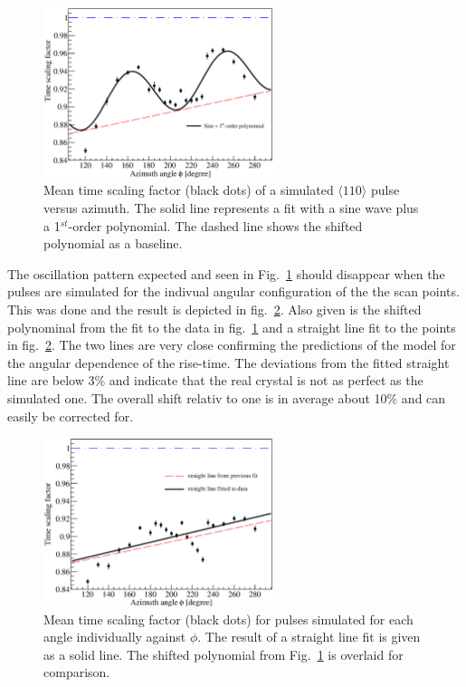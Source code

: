 \begin{figure}[htbp]
\centering
\includegraphics[width=0.6\textwidth]{tsc}
\caption{Mean time scaling factor (black dots) of a simulated $\langle 110 \rangle$ pulse versus azimuth. The solid line represents a fit with a sine wave plus a 1$^{st}$-order polynomial. The dashed line shows the shifted polynomial as a baseline.}
\label{fig:psa:tsc}
\end{figure}

The oscillation pattern expected and seen in Fig.~\ref{fig:psa:tsc} should disappear when the pulses are simulated for the indivual angular configuration of the the scan points. This was done and the result is depicted in fig.~\ref{fig:psa:tsl}. Also given is the shifted polynominal from the fit to the data in 
fig.~\ref{fig:psa:tsc} and a straight line fit to the points in fig.~\ref{fig:psa:tsl}. The two lines are very close confirming the predictions of the model for the angular dependence of the rise-time. The deviations from the fitted straight line are below 3\% and indicate that the real crystal is not as perfect as the simulated one. The overall shift relativ to one is in average about 10\% and can easily be corrected for. 

\begin{figure}[htbp]
\centering
\includegraphics[width=0.6\textwidth]{tsline}
\caption{Mean time scaling factor (black dots) for pulses simulated for each angle individually against $\phi$. 
The result of a straight line fit is given as a solid line.
The shifted polynomial from Fig.~\ref{fig:psa:tsc} is overlaid for comparison. }
\label{fig:psa:tsl}
\end{figure}


